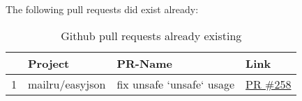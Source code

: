 The following pull requests did exist already:

\begin{table}[h]
    \centering
    \caption{Github pull requests already existing}
    \label{tbl:pull-requests-existing}
    \begin{tabular}{llll}
        \toprule
        {} & Project & PR-Name & Link \\
        \midrule
        1  & mailru/easyjson & fix unsafe `unsafe` usage & \href{https://github.com/mailru/easyjson/pull/258}{PR \#258} \\
        \bottomrule
    \end{tabular}
\end{table}
